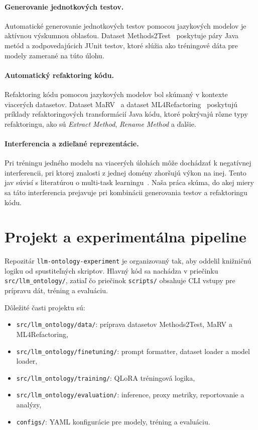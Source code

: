 \documentclass[11pt,a4paper]{article}
\newcommand{\projectname}{\texttt{llm-ontology-experiment}}
\begin{document}
\paragraph{Generovanie jednotkových testov.}
Automatické generovanie jednotkových testov pomocou jazykových modelov je aktívnou výskumnou oblasťou. Dataset Methods2Test~\cite{methods2test} poskytuje páry Java metód a zodpovedajúcich JUnit testov, ktoré slúžia ako tréningové dáta pre modely zamerané na túto úlohu.

\paragraph{Automatický refaktoring kódu.}
Refaktoring kódu pomocou jazykových modelov bol skúmaný v kontexte viacerých datasetov. Dataset MaRV~\cite{marv_dataset,marv} a dataset ML4Refactoring~\cite{ml4refactoring} poskytujú príklady refaktoringových transformácií Java kódu, ktoré pokrývajú rôzne typy refaktoringu, ako sú \textit{Extract Method}, \textit{Rename Method} a ďalšie.

\paragraph{Interferencia a zdieľané reprezentácie.}
Pri tréningu jedného modelu na viacerých úlohách môže dochádzať k negatívnej interferencii, pri ktorej znalosti z jednej domény zhoršujú výkon na inej. Tento jav súvisí s literatúrou o multi-task learningu~\cite{multitask}. Naša práca skúma, do akej miery sa táto interferencia prejavuje pri kombinácii generovania testov a refaktoringu kódu.



\section{Projekt a experimentálna pipeline}

Repozitár \projectname{} je organizovaný tak, aby oddelil knižničnú logiku od spustiteľných skriptov. Hlavný kód sa nachádza v priečinku \texttt{src/llm\_ontology/}, zatiaľ čo priečinok \texttt{scripts/} obsahuje CLI vstupy pre prípravu dát, tréning a evaluáciu.

Dôležité časti projektu sú:
\begin{itemize}
\item \texttt{src/llm\_ontology/data/}: príprava datasetov Methods2Test, MaRV a ML4Refactoring,
\item \texttt{src/llm\_ontology/finetuning/}: prompt formatter, dataset loader a model loader,
\item \texttt{src/llm\_ontology/training/}: QLoRA tréningová logika,
\item \texttt{src/llm\_ontology/evaluation/}: inference, proxy metriky, reportovanie a analýzy,
\item \texttt{configs/}: YAML konfigurácie pre modely, tréning a evaluáciu.
\end{itemize}
\end{document}
